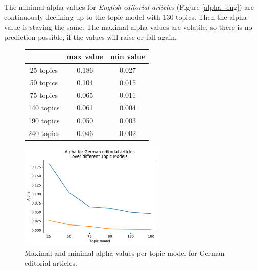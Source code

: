 The minimal alpha values for \textit{English editorial articles} (Figure \ref{alpha_eng}) are continuously declining up to the topic model with 130 topics. Then the alpha value is staying the same. The maximal alpha values are volatile, so there is no prediction possible, if the values will raise or fall again.
\begin{figure}[h]
	\begin{minipage}{0.5\textwidth}
		\centering
		\begin{tabular}[t]{c|cc}
			&max value & min value\\
			\hline
			25 topics&0.186&0.027\\
			50 topics&0.104&0.015\\
			75 topics&0.065&0.011\\
			140 topics&	0.061&0.004\\
			190 topics &0.050&0.003\\
			240 topics&	0.046&0.002\\
		\end{tabular}
	\end{minipage}%
	\begin{minipage}{0.5\textwidth}
		\centering
		\includegraphics[width=7cm]{gfx/Eval_IC/German_Editorial_Alpha.pdf}
	\end{minipage}
	\caption{Maximal and minimal alpha values per topic model for German editorial articles.}
	\label{alpha_ger}
\end{figure}
